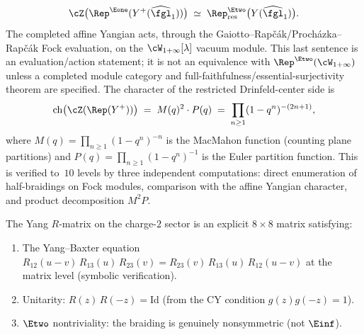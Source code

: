 \begin{theorem}
\label{thm:c3-drinfeld-center}
\[
 \cZ\bigl(\Rep^{\Eone}(Y^+(\widehat{\fgl}_1))\bigr)
 \;\simeq\;
 \Rep^{\Etwo}_{\mathrm{res}}\bigl(Y(\widehat{\fgl}_1)\bigr).
\]
The completed affine Yangian acts, through the
Gaiotto--Rap\v{c}\'ak/Proch\'azka--Rap\v{c}\'ak Fock evaluation, on the
$\cW_{1+\infty}[\lambda]$ vacuum module. This last sentence is an
evaluation/action statement; it is not an equivalence with
$\Rep^{\Etwo}(\cW_{1+\infty})$ unless a completed module category and
full-faithfulness/essential-surjectivity theorem are specified. The
character of the restricted Drinfeld-center side is
\begin{equation}
\label{eq:drinfeld-center-character}
 \mathrm{ch}\bigl(\cZ(\Rep(Y^+))\bigr) \;=\; M(q)^2 \cdot P(q)
 \;=\; \prod_{n \geq 1} (1-q^n)^{-(2n+1)},
\end{equation}
where $M(q) = \prod_{n \geq 1}(1-q^n)^{-n}$ is the MacMahon function (counting plane partitions) and $P(q) = \prod_{n \geq 1}(1-q^n)^{-1}$ is the Euler partition function. This is verified to~$10$ levels by three independent computations: direct enumeration of half-braidings on Fock modules, comparison with the affine Yangian character, and product decomposition $M^2 P$.

The Yang $R$-matrix on the charge-$2$ sector is an explicit $8 \times 8$ matrix satisfying:
\begin{enumerate}[label=\textup{(\roman*)}]
 \item The Yang--Baxter equation $R_{12}(u-v)\,R_{13}(u)\,R_{23}(v) = R_{23}(v)\,R_{13}(u)\,R_{12}(u-v)$ at the matrix level (symbolic verification).
 \item Unitarity: $R(z)\,R(-z) = \mathrm{Id}$ (from the CY condition $g(z)g(-z) = 1$).
 \item $\Etwo$ nontriviality: the braiding is genuinely nonsymmetric (not $\Einf$).
\end{enumerate}
\end{theorem}

